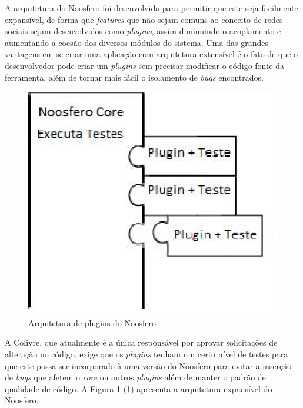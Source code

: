 
A arquitetura do Noosfero foi desenvolvida para permitir que este seja facilmente
expansível, de forma que \textit{features} que não sejam comuns ao conceito de
redes sociais sejam desenvolvidos como \textit{plugins}, assim diminuindo
o acoplamento e aumentando a coesão dos diversos módulos do sistema.
%
Uma das grandes vantagens em se criar uma aplicação com arquitetura extensível
é o fato de que o desenvolvedor pode criar um \textit{plugins}
sem precisar modificar o código fonte da ferramenta, além de tornar mais
fácil o isolamento de \textit{bugs} encontrados. 

\begin{figure}[h]
	\centering
	\label{plugins}
		\includegraphics[keepaspectratio=true,scale=0.6]{figuras/plugins.eps}
	\caption{Arquitetura de plugins do Noosfero}
\end{figure}

A Colivre, que atualmente é a única responsável por aprovar solicitações de
alteração no código, exige que os \textit{plugins} tenham um certo nível de
testes para que este possa ser incorporado à uma versão do Noosfero para
evitar a inserção de \textit{bugs} que afetem o \textit{core} ou
outros \textit{plugins} além de manter o padrão de qualidade de código. A
Figura 1 (\ref{plugins}) apresenta a arquitetura expansível do Noosfero.

